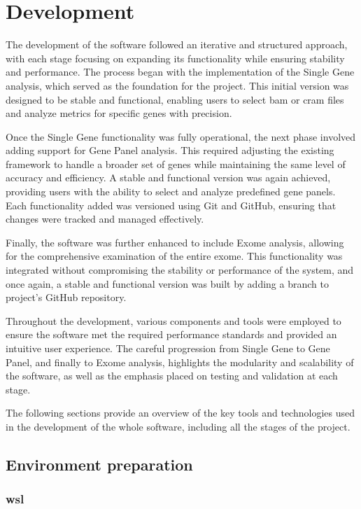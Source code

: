 \section{Development}

The development of the software followed an iterative and structured approach, with each stage focusing on expanding its functionality while ensuring stability and performance. The process began with the implementation of the Single Gene analysis, which served as the foundation for the project. This initial version was designed to be stable and functional, enabling users to select \ac{bam} or \ac{cram} files and analyze metrics for specific genes with precision.

Once the Single Gene functionality was fully operational, the next phase involved adding support for Gene Panel analysis. This required adjusting the existing framework to handle a broader set of genes while maintaining the same level of accuracy and efficiency. A stable and functional version was again achieved, providing users with the ability to select and analyze predefined gene panels. Each functionality added was versioned using Git and GitHub, ensuring that changes were tracked and managed effectively.

Finally, the software was further enhanced to include Exome analysis, allowing for the comprehensive examination of the entire exome. This functionality was integrated without compromising the stability or performance of the system, and once again, a stable and functional version was built by adding a branch to project's GitHub repository.

Throughout the development, various components and tools were employed to ensure the software met the required performance standards and provided an intuitive user experience. The careful progression from Single Gene to Gene Panel, and finally to Exome analysis, highlights the modularity and scalability of the software, as well as the emphasis placed on testing and validation at each stage.

The following sections provide an overview of the key tools and technologies used in the development of the whole software, including all the stages of the project.

\subsection{Environment preparation}
\subsubsection{\textbf{\acl{wsl}}}

